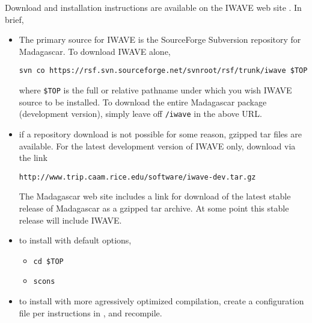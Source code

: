 Download and installation instructions are available on the IWAVE web
site \cite[]{IWAVE}. In brief,
\begin{itemize}
\item The primary source for IWAVE is the SourceForge Subversion repository for
  Madagascar. To download IWAVE alone,
\begin{verbatim}
svn co https://rsf.svn.sourceforge.net/svnroot/rsf/trunk/iwave $TOP
\end{verbatim}
where {\tt \$TOP} is the full or relative pathname under which you
wish IWAVE source to be installed. To download the entire Madagascar
package (development version), simply leave off {\tt /iwave} in the
above URL. 
\item if a repository download is not possible for some reason,
  gzipped tar files are available. For the latest development version
  of IWAVE only, download via the link
\begin{verbatim}
http://www.trip.caam.rice.edu/software/iwave-dev.tar.gz
\end{verbatim}
The Madagascar web site includes a link for
download of the latest stable release of Madagascar as a gzipped
tar archive. At some point this stable release will include IWAVE.
\item to install with default options, 
\begin{itemize}
\item {\tt cd \$TOP}
\item {\tt scons}
\end{itemize}
\item to install with more agressively optimized compilation, create a
  configuration file per instructions in \cite[]{IWAVE}, and
  recompile.
\end{itemize}
